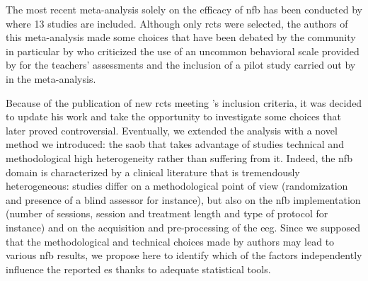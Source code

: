 The most recent meta-analysis solely on the efficacy of \gls{nfb} has been conducted by \citet{Cortese2016} where 13
studies are included. Although only \glspl{rct} were selected, the authors of this meta-analysis made some choices that
have been debated by the community in particular by \citet{Micoulaud2016} who criticized the use of an uncommon
behavioral scale provided by \citet{Steiner2014} for the teachers' assessments and the inclusion of a pilot study
carried out by \citet{Arnold2014} in the meta-analysis. 

Because of the publication of new \glspl{rct} meeting \citeauthor{Cortese2016}'s inclusion criteria, it was decided to
update his work and take the opportunity to investigate some choices that later proved controversial. Eventually, we
extended the analysis with a novel method we introduced: the \gls{saob} that takes advantage of studies technical and
methodological high heterogeneity rather than suffering from it. Indeed, the \gls{nfb} domain is characterized by a
clinical literature that is tremendously heterogeneous: studies differ on a methodological point of view (randomization
and presence of a blind assessor for instance), but also on the \gls{nfb} implementation (number of sessions, session
and treatment length and type of protocol for instance) and on the acquisition and pre-processing of the \gls{eeg}.
Since we supposed that the methodological and technical choices made by authors may lead to various \gls{nfb} results,
we propose here to identify which of the factors independently influence the reported \gls{es} thanks to adequate
statistical tools.






